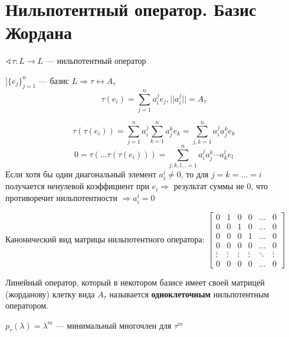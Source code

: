 

\cfoot{}



\section*{Нильпотентный оператор. Базис Жордана}

$\sphericalangle \tau : L \to L$ --- нильпотентный оператор

$] \{e_j\}_{j=1}^n$ --- базис $L \Rightarrow \tau \leftrightarrow A_\tau$
$$\tau(e_i)=\sum_{j=1}^n a_i^j e_j, ||a_i^j||=A_\tau$$

$$\tau(\tau(e_i))=\sum_{j=1}^n a_i^j \sum_{k=1}^n a_j^k e_k = \sum_{j,k=1}^n a_i^j a_j^ke_k$$
$$0=\tau(\ldots \tau(\tau(e_i)))=\sum_{j,k,l\ldots = 1}^n a_i^j a_j^k\cdots a_k^l e_l$$
Если хотя бы один диагональный элемент $a_i^i\not=0$, то для $j=k=\ldots=i$ получается ненулевой коэффициент при $e_i \Rightarrow$ результат суммы не $0$, что противоречит нильпотентности $\Rightarrow a_i^i=0$

Канонический вид матрицы нильпотентного оператора: $\begin{bmatrix}
    0 & 1 & 0 & 0 & \ldots & 0 \\
    0 & 0 & 1 & 0 & \ldots & 0 \\
    0 & 0 & 0 & 1 & \ldots & 0 \\
    0 & 0 & 0 & 0 & \ldots & 0 \\
    \vdots & \vdots & \vdots & \vdots & \ddots & \vdots \\
    0 & 0 & 0 & 0 & \ldots & 0 
\end{bmatrix}$

\begin{definition}
    Линейный оператор, который в некотором базисе имеет своей матрицей (жорданову) клетку вида $A_\tau$ называется \textbf{одноклеточным} нильпотентным оператором.
\end{definition}

\begin{lemma}
    $p_\tau(\lambda)=\lambda^m$ --- минимальный многочлен для $\tau^m$
\end{lemma}

